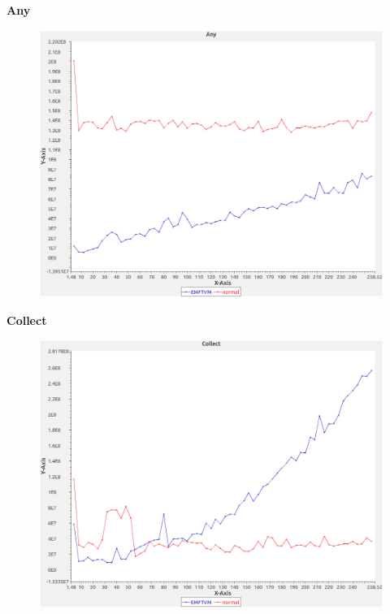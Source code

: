 \noindent\textbf{Any}

\begin{figure}[h]
\centering
\includegraphics[width=\textwidth]{graphs/set/Any}
\end{figure}
\pagebreak

\noindent\textbf{Collect}

\begin{figure}[h]
\centering
\includegraphics[width=\textwidth]{graphs/set/Collect}
\end{figure}
\pagebreak

